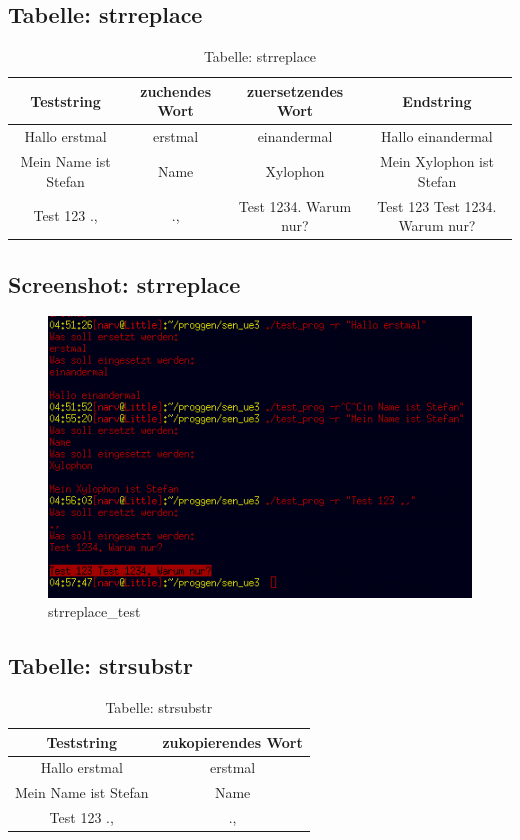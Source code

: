 \documentclass{scrartcl}
\begin{document}
\newpage
\subsection{Tabelle: strreplace}
\begin{table}[H]
  \centering
  \begin{tabular}{|c|c|c|c|}
    \hline
    Teststring & zuchendes Wort & zuersetzendes Wort & Endstring \\
    \hline
    Hallo erstmal & erstmal & einandermal & Hallo einandermal \\
    \hline
    Mein Name ist Stefan & Name & Xylophon & Mein Xylophon ist Stefan  \\
    \hline
    Test 123 ., & ., & Test 1234. Warum nur? & Test 123 Test 1234. Warum nur?  \\
    \hline
  \end{tabular}
  \caption{Tabelle: strreplace}
\end{table}
\subsection{Screenshot: strreplace}
\begin{figure}[H]
  \centering
  \includegraphics[width=0.9\linewidth]{images/strreplace_test.png}
  \caption{strreplace\_test}
  \label{fig:digraph}
\end{figure}

\newpage
\subsection{Tabelle: strsubstr}
\begin{table}[H]
  \centering
  \begin{tabular}{|c|c|}
    \hline
    Teststring & zukopierendes Wort \\
    \hline
    Hallo erstmal & erstmal \\
    \hline
    Mein Name ist Stefan & Name \\
    \hline
    Test 123 ., & ., \\
    \hline
  \end{tabular}
  \caption{Tabelle: strsubstr}
\end{table}
\end{document}
